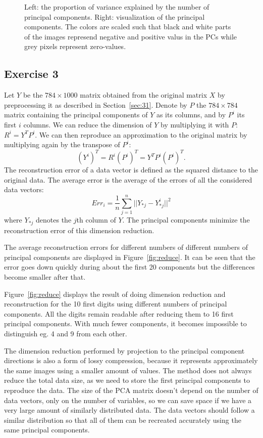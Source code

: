 \documentclass{article}
\begin{document}
\begin{figure}
	\caption{Left: the proportion of variance explained by the number of principal components.
	Right: visualization of the principal components.
The colors are scaled such that black and white parts of the images represend negative and positive valus in the PCs while grey pixels represent zero-values.}\label{fig:pcavar}
\end{figure}

\subsection{Exercise 3}
Let $Y$ be the $784\times 1000$ matrix obtained from the original matrix $X$ by preprocessing it as described in Section~\ref{sec:31}.
Denote by $P$ the $784\times 784$ matrix containing the principal components of $Y$ as its columns, and by $P^i$ its first $i$ columns.
We can reduce the dimension of $Y$ by multiplying it with $P$: $R^i=Y^TP^i$.
We can then reproduce an approximation to the original matrix by multiplying again by the transpose of $P^i$: $$(Y^i)^T=R^i(P^i)^T=Y^TP^i(P^i)^T.$$
The reconstruction error of a data vector is defined as the squared distance to the original data. The average error is the average of the errors of all the considered data vectors:
$$Err_i = \frac{1}{n}\sum_{j=1}^{n}||Y_{*j}-Y^i_{*j}||^2$$ where $Y_{*j}$ denotes the $j$th column of $Y$. The principal components minimize the reconstruction error of this dimension reduction.

The average reconstruction errors for different numbers of different numbers of principal components are displayed in Figure~\ref{fig:reduce}.
It can be seen that the error goes down quickly during about the first 20 components but the differences become smaller after that.

Figure~\ref{fig:reduce} displays the result of doing dimension reduction and reconstruction for the 10 first digits using different numbers of principal components.
All the digits remain readable after reducing them to 16 first principal components.
With much fewer components, it becomes impossible to distinguish eg. 4 and 9 from each other.

The dimension reduction performed by projection to the principal component directions is also a form of lossy compression, because it represents approximately the same images using a smaller amount of values.
The method does not always reduce the total data size, as we need to store the first principal components to reproduce the data.
The size of the PCA matrix doesn't depend on the number of data vectors, only on the number of variables, so we can save space if we have a very large amount of similarly distributed data.
The data vectors should follow a similar distribution so that all of them can be recreated accurately using the same principal components.
\end{document}
